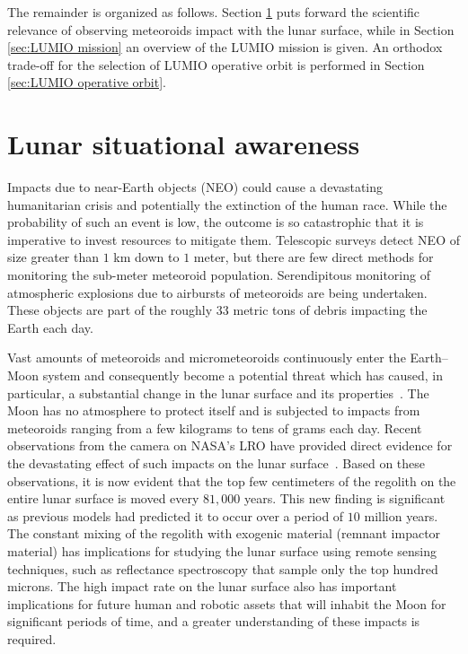 The remainder is organized as follows. Section \ref{sec:Lunar situational awareness} puts forward the scientific relevance of observing meteoroids impact with the lunar surface, while in Section \ref{sec:LUMIO mission} an overview of the LUMIO mission is given. An orthodox trade-off for the selection of LUMIO operative orbit is performed in Section \ref{sec:LUMIO operative orbit}.


%
\section{Lunar situational awareness}\label{sec:Lunar situational awareness}
Impacts due to near-Earth objects (NEO) could cause a devastating humanitarian crisis and potentially the extinction of the human race. While the probability of such an event is low, the outcome is so catastrophic that it is imperative to invest resources to mitigate them. Telescopic surveys detect {NEO} of size greater than $1$ km down to $1$ meter, but there are few direct methods for monitoring the sub-meter meteoroid population. Serendipitous monitoring of atmospheric explosions due to airbursts of meteoroids are being undertaken. These objects are part of the roughly $33$ metric tons of debris impacting the Earth each day.

Vast amounts of meteoroids and micrometeoroids continuously enter the Earth--Moon system and consequently become a potential threat which has caused, in particular, a substantial change in the lunar surface and its {properties~\cite{oberst2012present}}. The Moon has no atmosphere to protect itself and is subjected to impacts from meteoroids ranging from a few kilograms to tens of grams each day. Recent observations from the camera on NASA's {LRO} have provided direct evidence for the devastating effect of such impacts on the lunar {surface~\cite{speyerer2016quantifying}}. Based on these observations, it is now evident that the top few centimeters of the regolith on the entire lunar surface is moved every $81,000$ years. This new finding is significant as previous models had predicted it to occur over a period of $10$ million years. The constant mixing of the regolith with exogenic material (remnant impactor material) has implications for studying the lunar surface using remote sensing techniques, such as reflectance spectroscopy that sample only the top hundred microns. The high impact rate on the lunar surface also has important implications for future human and robotic assets that will inhabit the Moon for significant periods of time, and a greater understanding of these impacts is required.

